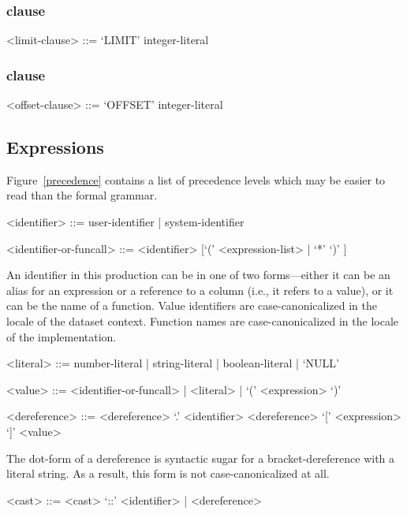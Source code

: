 \documentclass{article}
\begin{document}
\subsubsection{ clause}
\begin{grammar}
<limit-clause> ::= `LIMIT' integer-literal
\end{grammar}

\subsubsection{ clause}
\begin{grammar}
<offset-clause> ::= `OFFSET' integer-literal
\end{grammar}

\subsection{Expressions}

Figure~\vref{precedence} contains a list of precedence levels which
may be easier to read than the formal grammar.

\begin{grammar}
<identifier> ::= user-identifier | system-identifier

<identifier-or-funcall> ::= <identifier> [`(' <expression-list> | `*' `)' ]
\end{grammar}

An identifier in this production can be in one of two forms---either
it can be an alias for an expression or a reference to a column (i.e.,
it refers to a value), or it can be the name of a function.  Value
identifiers are case-canonicalized in the locale of the dataset
context.  Function names are case-canonicalized in the locale of the
\SoQL{} implementation.

\begin{grammar}
<literal> ::= number-literal | string-literal | boolean-literal | `NULL'

<value> ::= <identifier-or-funcall> | <literal> | `(' <expression> `)'

<dereference> ::= <dereference> `.' <identifier>
 \alt <dereference> `[' <expression> `]'
 \alt <value>
\end{grammar}

The dot-form of a dereference is syntactic sugar for a
bracket-dereference with a literal string.  As a result, this form is
not case-canonicalized at all.

\begin{grammar}
<cast> ::= <cast> `::' <identifier> | <dereference>
\end{grammar}
\end{document}
